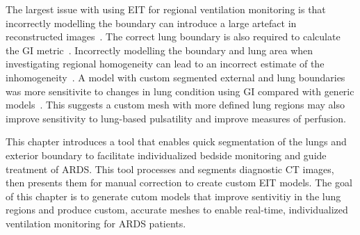 The largest issue with using EIT for regional 
ventilation monitoring is that incorrectly modelling the 
boundary can introduce a large artefact in reconstructed
images~\parencite{grychtol_impact_2012}. The correct 
lung boundary is also required to calculate the GI
metric~\parencite{zhao_evaluation_2009}.
Incorrectly modelling the boundary and lung area when investigating 
regional homogeneity can lead to an incorrect estimate of the 
inhomogeneity~\parencite{yang_lung_2021}. 
A model with custom segmented external and lung boundaries 
was more sensitivite to changes in lung condition using GI 
compared with generic models~\parencite{yang_lung_2021}.
This suggests a custom mesh with more defined lung regions 
may also improve sensitivity to lung-based pulsatility and 
improve measures of perfusion.

This chapter introduces a tool that enables quick segmentation 
of the lungs and exterior boundary to facilitate individualized
bedside monitoring and guide treatment of ARDS.
This tool processes and segments diagnostic CT images, 
then presents them for manual correction 
to create custom EIT models. 
The goal of this chapter is to generate cutom models that improve sentivitiy 
in the lung regions and produce custom, accurate 
meshes 
to enable real-time, individualized ventilation
monitoring for ARDS patients.  


